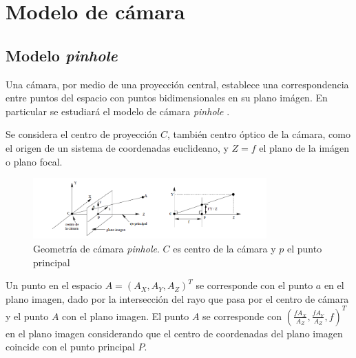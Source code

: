 ﻿\chapter{Modelo de cámara}

\section{Modelo \emph{pinhole}}



Una cámara, por medio de una proyección central, establece una correspondencia entre puntos del espacio con puntos bidimensionales en su plano imágen. En particular se estudiará el modelo de cámara \emph{pinhole} \cite{LibroCompGrafica3}.

Se considera el centro de proyección $C$, también centro óptico de la cámara, como el origen de un sistema de coordenadas euclideano, y $Z = f$ el plano de la imágen o plano focal.

\begin{figure}[H]
  \centering
    \includegraphics[width=0.8\textwidth]{./Cap2_videomapping/pinhole.png}
  \caption{Geometría de cámara \emph{pinhole}. $C$ es centro de la cámara y $p$ el punto principal}
  \label{fig:Calib-Pinhole}
\end{figure}

Un punto en el espacio $A=(A_X, A_Y, A_Z)^T$ se corresponde con el punto $a$ en el plano imagen, dado por la intersección del rayo que pasa por el centro de cámara y el punto $A$ con el plano imagen. El punto $A$ se corresponde con $(\frac{fA_X}{A_Z}, \frac{fA_Y}{A_Z}, f)^T$ en el plano imagen considerando que el centro de coordenadas del plano imagen coincide con el punto principal $P$.

